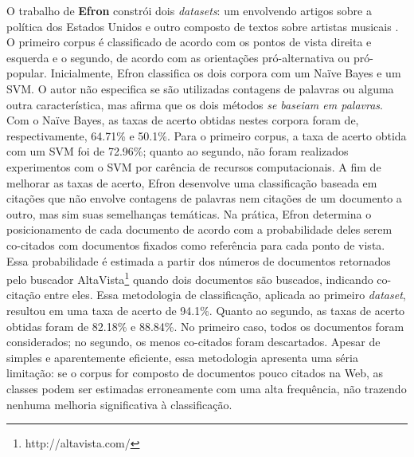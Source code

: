 O trabalho de \textbf{Efron} constrói dois \emph{datasets}: um envolvendo artigos sobre a política dos Estados Unidos e outro composto de textos sobre artistas musicais \cite{efron}. O primeiro corpus é classificado de acordo com os pontos de vista direita e esquerda e o segundo, de acordo com as orientações pró-alternativa ou pró-popular. Inicialmente, Efron classifica os dois corpora com um Naïve Bayes e um SVM. O autor não especifica se são utilizadas contagens de palavras ou alguma outra característica, mas afirma que os dois métodos \emph{se baseiam em palavras}. Com o Naïve Bayes, as taxas de acerto obtidas nestes corpora foram de, respectivamente, 64.71\% e 50.1\%. Para o primeiro corpus, a taxa de acerto obtida com um SVM foi de 72.96\%; quanto ao segundo, não foram realizados experimentos com o SVM por carência de recursos computacionais. A fim de melhorar as taxas de acerto,  Efron desenvolve uma classificação baseada em citações que não envolve contagens de palavras nem citações de um documento a outro, mas sim suas semelhanças temáticas. Na prática, Efron determina o posicionamento de cada documento de acordo com a probabilidade deles serem co-citados com  documentos fixados como referência para cada ponto de vista. Essa probabilidade é estimada a partir dos números de documentos retornados pelo buscador AltaVista\footnote{http://altavista.com/} quando dois documentos são buscados, indicando co-citação entre eles. Essa metodologia de classificação, aplicada ao primeiro \emph{dataset}, resultou em uma taxa de acerto de 94.1\%. Quanto ao segundo, as taxas de acerto obtidas foram de 82.18\% e 88.84\%. No primeiro caso, todos os documentos foram considerados; no segundo, os menos co-citados foram descartados. Apesar de simples e aparentemente eficiente, essa metodologia apresenta uma séria limitação: se o corpus for composto de documentos pouco citados na Web, as classes podem ser estimadas erroneamente com uma alta frequência, não trazendo nenhuma melhoria significativa à classificação.

